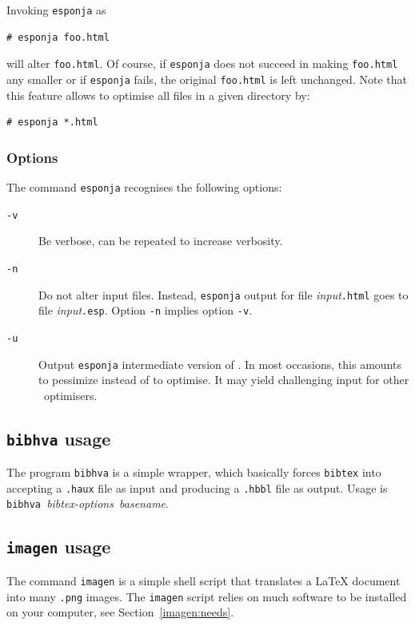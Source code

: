 Invoking \texttt{esponja} as
\begin{verbatim}
# esponja foo.html
\end{verbatim}
will alter \texttt{foo.html}.
Of course, if \texttt{esponja} does not succeed in making \texttt{foo.html} any
smaller or if \texttt{esponja} fails, the original \texttt{foo.html}
is left unchanged.
Note that this feature allows to optimise all \html{} files in a given directory
by:
\begin{verbatim}
# esponja *.html
\end{verbatim}



\subsubsection{Options}\label{esponjaoptions}
The command \texttt{esponja} recognises the following options:
\begin{description}
\item[{\tt -v}]Be verbose, can be repeated to increase verbosity.
\item[{\tt -n}]Do not alter input files. Instead, \texttt{esponja}
output for file \textit{input}\texttt{.html} goes to file
\textit{input}\texttt{.esp}. Option \texttt{-n} implies option \texttt{-v}.
\item[{\tt -u}]Output \texttt{esponja} intermediate version of \html.
In most occasions, this amounts to pessimize instead of to optimise.
It may yield challenging input for other \html~optimisers.
\end{description}

\subsection{\texttt{bibhva}\label{bibhva} usage}
The program \texttt{bibhva}
is a simple wrapper, which basically
forces \texttt{bibtex} into accepting a \texttt{.haux} file as input
and producing a \texttt{.hbbl} file as output.
Usage is
\texttt{bibhva }\textit{bibtex-options}\texttt{ }\textit{basename}.


\subsection{\texttt{imagen} usage}\label{imagenusage}
The command \texttt{imagen} is a simple shell script that translates
a \LaTeX{} document into many \texttt{.png} images.
The \texttt{imagen} script relies on much software to be installed on
your computer, see Section~\ref{imagen:needs}.

